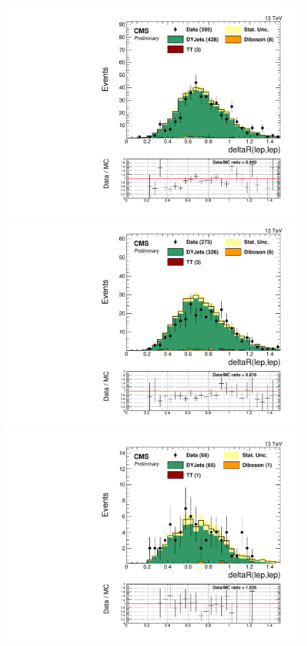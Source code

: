 \begin{figure}[h]
\begin{center}
\includegraphics[scale=0.37]{figures/control/deltaRleplepMLP.pdf}
\includegraphics[scale=0.37]{figures/control/deltaRleplepELP.pdf}\\[2cm]
\includegraphics[scale=0.37]{figures/control/deltaRleplepMHP.pdf}

\end{center}
\end{figure}
